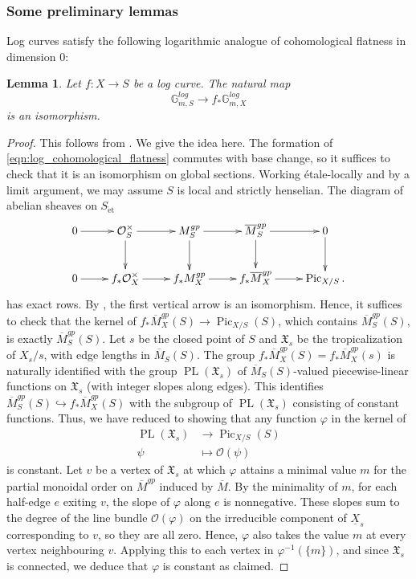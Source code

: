 \documentclass[a4paper,11pt]{amsart} %
\numberwithin{equation}{subsection}
\newcommand{\on}[1]{\operatorname{#1}}
\newcommand{\ca}[1]{{\mathcal{#1}}}
\newcommand{\ul}[1]{{\underline{#1}}}
\newcommand{\hra}{\hookrightarrow}
\def\et{\mathrm{\acute{e}t}}
\def\o#1{\overline{#1}}
\theoremstyle{definition}
\theoremstyle{plain}%
\newtheorem{lemma}[definition]{Lemma}
\theoremstyle{remark}
\renewcommand{\phi}{\varphi} %
\begin{document}
\subsubsection{Some preliminary lemmas}
Log curves satisfy the following logarithmic analogue of cohomological flatness in dimension $0$:
\begin{lemma}\label{f_*M_X=M_S} Let $f\colon X \to S$ be a log curve. The natural map
\begin{equation}\label{eqn:log_cohomological_flatness}
    \mathbb{G}_{m,S}^{log} \to f_*\mathbb{G}_{m,X}^{log}
\end{equation}
is an isomorphism.
\end{lemma}

\begin{proof}
    This follows from \cite[Lemma 4.6.1]{molcho_wise_2022}. We give the idea here. The formation of \ref{eqn:log_cohomological_flatness} commutes with base change, so it suffices to check that it is an isomorphism on global sections. Working \'etale-locally and by a limit argument, we may assume $S$ is local and strictly henselian. The diagram of abelian sheaves on $S_{\et}$
    \[
    \xymatrix{
    0 \ar[r] & \ca O_S^\times\ar[r]\ar[d] & M_S^{gp}\ar[r]\ar[d] & \o M_S^{gp}\ar[r]\ar[d] & 0 \ar[d] \\
    0 \ar[r] & f_*\ca O_X^\times\ar[r] & f_* M_X^{gp}\ar[r] & f_* \o M_X^{gp}\ar[r] & \on{Pic}_{X/S}.
    }
    \]
    has exact rows. By \cite[\href{https://stacks.math.columbia.edu/tag/0GKA}{Tag 0GKA}]{stacks-project}, the first vertical arrow is an isomorphism. Hence, it suffices to check that the kernel of $f_* \o M_X^{gp}(S) \to \on{Pic}_{X/S}(S)$, which contains $\o M_S^{gp}(S)$, is exactly $\o M_{S}^{gp}(S)$. Let $s$ be the closed point of $S$ and $\mathfrak X_s$ be the tropicalization of $X_s/s$, with edge lengths in $\o M_S(S)$. The group $f_* \o M_X^{gp}(S)=f_* \o M_X^{gp}(s)$ is naturally identified with the group $\on{PL}(\mathfrak X_s)$ of $\o M_S(S)$-valued piecewise-linear functions on $\mathfrak X_s$ (with integer slopes along edges). This identifies $\o M_{S}^{gp}(S) \hra f_*\o M_X^{gp}(S)$ with the subgroup of $\on{PL}(\mathfrak X_s)$ consisting of constant functions. Thus, we have reduced to showing that any function $\phi$ in the kernel of
    \begin{align*}
        \on{PL}(\mathfrak X_s) & \to \on{Pic}_{X/S}(S) \\
        \psi & \mapsto \ca O(\psi)
    \end{align*}
    is constant. Let $v$ be a vertex of $\mathfrak X_s$ at which $\phi$ attains a minimal value $m$ for the partial monoidal order on $\o M^{gp}$ induced by $\o M$. By the minimality of $m$, for each half-edge $e$ exiting $v$, the slope of $\phi$ along $e$ is nonnegative. These slopes sum to the degree of the line bundle $\ca O(\phi)$ on the irreducible component of $\ul X_s$ corresponding to $v$, so they are all zero. Hence, $\phi$ also takes the value $m$ at every vertex neighbouring $v$. Applying this to each vertex in $\phi^{-1}(\{m\})$, and since $\mathfrak X_s$ is connected, we deduce that $\phi$ is constant as claimed.
\end{proof}
\end{document}
